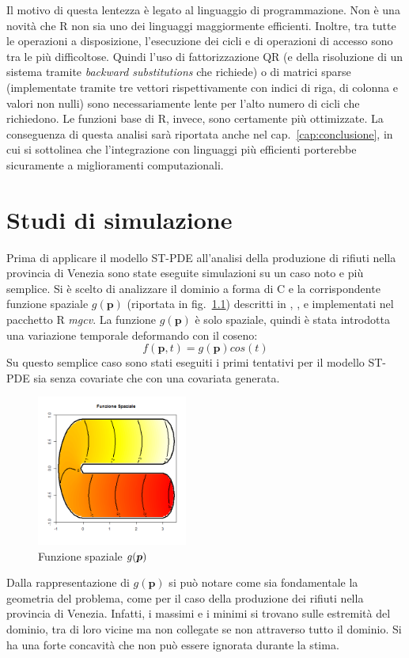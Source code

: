 \documentclass[a4paper,11pt,twoside,openright]{book}							%
\begin{document}
Il motivo di questa lentezza è legato al linguaggio di programmazione. Non è una novità che R non sia uno dei linguaggi maggiormente efficienti. Inoltre, tra tutte le operazioni a disposizione, l'esecuzione dei cicli e di operazioni di accesso sono tra le più difficoltose. Quindi l'uso di fattorizzazione QR (e della risoluzione di un sistema tramite \textit{backward substitutions} che richiede) o di matrici sparse (implementate tramite tre vettori rispettivamente con indici di riga, di colonna e valori non nulli) sono necessariamente lente per l'alto numero di cicli che richiedono. Le funzioni base di R, invece, sono certamente più ottimizzate. La conseguenza di questa analisi sarà riportata anche nel cap.~\ref{cap:conclusione}, in cui si sottolinea che l'integrazione con linguaggi più efficienti porterebbe sicuramente a miglioramenti computazionali.

\chapter{Studi di simulazione}
\label{cap:domC}
Prima di applicare il modello ST-PDE all'analisi della produzione di rifiuti nella provincia di Venezia sono state eseguite simulazioni su un caso noto e più semplice. Si è scelto di analizzare il dominio a forma di C e la corrispondente funzione spaziale $g(\bm p)$ (riportata in fig.~\ref{fig:domC_fstest}) descritti in \cite{art:ramsay}, \cite{art:sangalli}, \cite{art:wood} e implementati nel pacchetto R \textit{mgcv}. La funzione $g(\bm p)$ è solo spaziale, quindi è stata introdotta una variazione temporale deformando con il coseno:
$$
f(\bm p, t)=g(\bm p)cos(t)
$$
Su questo semplice caso sono stati eseguiti i primi tentativi per il modello ST-PDE sia senza covariate che con una covariata generata.
\begin{figure}[h]
	\centering
	\includegraphics[width=0.44\textwidth]{Immagini/DomCinizio/DomC_fstest.png}   
	\caption{Funzione spaziale $g(\protect\bm{p})$}
	\label{fig:domC_fstest}
\end{figure}
\newpage
Dalla rappresentazione di $g(\bm p)$ si può notare come sia fondamentale la geometria del problema, come per il caso della produzione dei rifiuti nella provincia di Venezia. Infatti, i massimi e i minimi si trovano sulle estremità del dominio, tra di loro vicine ma non collegate se non attraverso tutto il dominio. Si ha una forte concavità che non può essere ignorata durante la stima.
\end{document}
